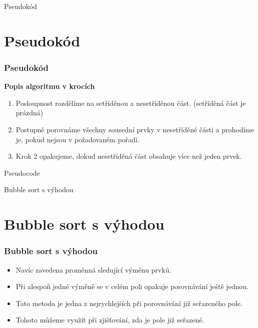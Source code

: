 \documentclass[11pt, hyperref={unicode}]{beamer}
\begin{document}
    \begin{frame}
        \centering
        {\color{blue!65!black!90!white}\Huge{Pseudokód}}
    \end{frame}

    \section{Pseudokód}

    \begin{frame}
        \frametitle{Pseudokód}
        \textbf{Popis algoritmu v krocích}
        \pause
        \begin{enumerate}
          \item Posloupnost rozdělíme na setříděnou a nesetříděnou část. {\color{blue!75!white!40!gray}(setříděná část je prázdná)}
              \pause
          \item Postupně porovnáme všechny sousední prvky v nesetříděné části a prohodíme je, pokud nejsou v požadovaném pořadí.
              \pause
          \item Krok 2 opakujeme, dokud nesetříděná část obsahuje více než jeden prvek.
        \end{enumerate}
    \end{frame}

    \begin{frame}

        \begin{algorithm}[H]

            \caption{Pseudocode}
        \end{algorithm}
    \end{frame}

    \begin{frame}
        \centering
        {\color{blue!65!black!90!white}\Huge{Bubble sort s výhodou}}
    \end{frame}

    \section{Bubble sort s výhodou}

    \begin{frame}
        \frametitle{Bubble sort s výhodou}
        \begin{itemize}
          \item Navíc zavedena \alert{proměnná} sledující výměnu prvků.
          \item Při alespoň jedné výměně se v celém poli opakuje porovnávání ještě jednou.
          \item Tato metoda je jedna z nejrychlejších při porovnávání již seřazeného pole.
          \item Tohoto můžeme využít při zjišťování, zda je pole již seřazené.
        \end{itemize}
    \end{frame}
\end{document}
